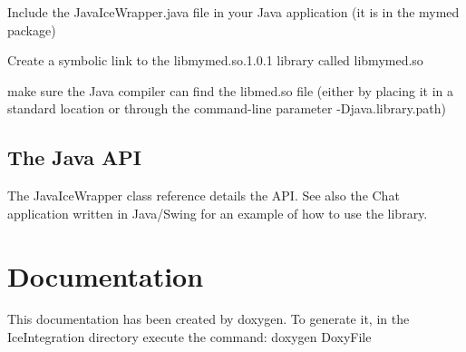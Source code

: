 \begin{DoxyEnumerate}
\item Include the JavaIceWrapper.java file in your Java application (it is in the mymed package)
\item Create a symbolic link to the libmymed.so.1.0.1 library called libmymed.so
\item make sure the Java compiler can find the libmed.so file (either by placing it in a standard location or through the command-\/line parameter -\/Djava.library.path)
\end{DoxyEnumerate}\hypertarget{index_api}{}\subsection{The Java API}\label{index_api}
The JavaIceWrapper class reference details the API. See also the Chat application written in Java/Swing for an example of how to use the library.\hypertarget{index_Documentation}{}\section{Documentation}\label{index_Documentation}
This documentation has been created by doxygen. To generate it, in the IceIntegration directory execute the command: doxygen DoxyFile



 